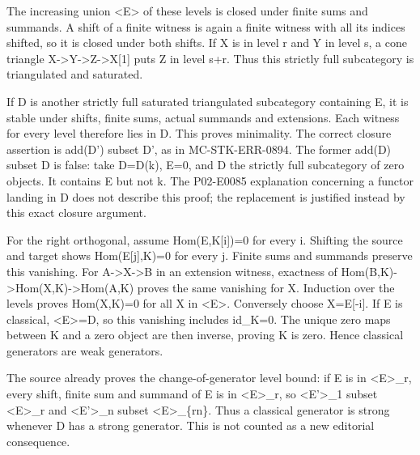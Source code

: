 The increasing union \textless E\textgreater{} of these levels is closed under finite sums and summands. A shift of a finite witness is again a finite witness with all its indices shifted,\allowbreak{} so it is closed under both shifts. If X is in level r and Y in level s,\allowbreak{} a cone triangle X\allowbreak{}->Y\allowbreak{}->Z\allowbreak{}->X[1]\allowbreak{} puts Z in level s\allowbreak{}+r. Thus this strictly full subcategory is triangulated and saturated.

If D\textquotesingle{} is another strictly full saturated triangulated subcategory containing E,\allowbreak{} it is stable under shifts,\allowbreak{} finite sums,\allowbreak{} actual summands and extensions. Each witness for every level therefore lies in D\textquotesingle. This proves minimality. The correct closure assertion is add(D')\allowbreak{} subset D',\allowbreak{} as in MC-STK-ERR-0894. The former add(D)\allowbreak{} subset D\textquotesingle{} is false:\allowbreak{} take D\allowbreak{}=D(k)\allowbreak{},\allowbreak{} E\allowbreak{}=0,\allowbreak{} and D\textquotesingle{} the strictly full subcategory of zero objects. It contains E but not k. The P02-E0085 explanation concerning a functor landing in D\textquotesingle{} does not describe this proof; the replacement is justified instead by this exact closure argument.

For the right orthogonal,\allowbreak{} assume Hom(E,\allowbreak{}K[i]\allowbreak{})\allowbreak{}\allowbreak{}=0 for every i. Shifting the source and target shows Hom(E[j]\allowbreak{},\allowbreak{}K)\allowbreak{}\allowbreak{}=0 for every j. Finite sums and summands preserve this vanishing. For A\allowbreak{}->X\allowbreak{}->B in an extension witness,\allowbreak{} exactness of Hom(B,\allowbreak{}K)\allowbreak{}\allowbreak{}->Hom(X,\allowbreak{}K)\allowbreak{}\allowbreak{}->Hom(A,\allowbreak{}K)\allowbreak{} proves the same vanishing for X. Induction over the levels proves Hom(X,\allowbreak{}K)\allowbreak{}\allowbreak{}=0 for all X in \textless E\textgreater. Conversely choose X\allowbreak{}=E[-i]\allowbreak{}. If E is classical,\allowbreak{} <E>\allowbreak{}=D,\allowbreak{} so this vanishing includes id\_\allowbreak{}K\allowbreak{}=0. The unique zero maps between K and a zero object are then inverse,\allowbreak{} proving K is zero. Hence classical generators are weak generators.

The source already proves the change-of-generator level bound:\allowbreak{} if E\textquotesingle{} is in <E>\_\allowbreak{}r,\allowbreak{} every shift,\allowbreak{} finite sum and summand of E\textquotesingle{} is in <E>\_\allowbreak{}r,\allowbreak{} so <E'>\_\allowbreak{}1 subset <E>\_\allowbreak{}r and <E'>\_\allowbreak{}n subset <E>\_\allowbreak{}\{rn\}. Thus a classical generator is strong whenever D has a strong generator. This is not counted as a new editorial consequence.

